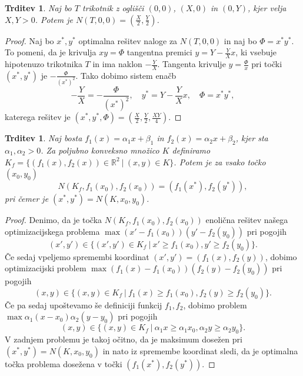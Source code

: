 \documentclass[10pt, a4paper]{article}
\newtheorem{trditev}[izr]{Trditev}
\newenvironment{noticeC}{%
  \tcolorbox[%
  notitle,
  empty,
  enhanced,  %
  breakable,
  coltext=black, 
  fontupper=\rmfamily,
  parbox=false,
  noparskip,
  sharp corners,
  boxrule=-1pt,  %
  frame hidden,
  left=7pt,  %
  right=7pt,
  top=5pt,
  bottom=5pt,
  before skip=2.5ex plus 2pt,
  after skip=2.5ex plus 2pt,
  overlay unbroken and last={%
  },
  ]}
{\endtcolorbox}
\newenvironment{dokaz}%
  {\begin{noticeC}\begin{proof}}%
  {\end{proof}\end{noticeC}}
\newcommand{\R}{\mathbb {R}}
\begin{document}
\begin{trditev}\label{trd:1}
  Naj bo $T$ trikotnik z oglišči $(0, 0)$, $(X, 0)$ in $(0, Y)$,
  kjer velja $X, Y > 0$. Potem je $N(T, 0, 0) = \left(\frac{X}{2}, \frac{Y}{2}\right)$.
\end{trditev}

\begin{dokaz}
  Naj bo $x^*, y^*$ optimalna rešitev naloge za $N(T, 0, 0)$
  in naj bo $\Phi = x^* y^*$. To pomeni, da je krivulja $xy = \Phi$ tangentna premici 
  $y = Y - \frac{Y}{X}x$, ki vsebuje hipotenuzo trikotnika $T$ in 
  ima naklon $-\frac{Y}{X}$. Tangenta krivulje $y = \frac{\Phi}{x}$
  pri točki $(x^*, y^*)$ je $-\frac{\Phi}{(x^*)^2}$.
  Tako dobimo sistem enačb 
  $$-\frac{Y}{X} = - \frac{\Phi}{(x^*)^2},\quad y^* = Y - \frac{Y}{X} x,\quad \Phi = x^* y^*,$$
  katerega rešitev je $(x^*, y^*, \Phi) = \left(\frac{X}{2}, \frac{Y}{2}, \frac{XY}{4}\right)$.
\end{dokaz}

\begin{trditev}\label{trd:2}
  Naj bosta $f_1 (x) = \alpha_1 x + \beta_1$ in $f_2 (x) = \alpha_2 x + \beta_2$,
  kjer sta $\alpha_1, \alpha_2 > 0$.
  Za poljubno konveksno množico $K$
  definiramo $K_f = \{(f_1 (x), f_2 (x))\in \R^2\ |\ (x, y) \in K\}$.
  Potem je za vsako točko $(x_0, y_0)$
  $$N(K_f, f_1(x_0), f_2 (x_0)) = (f_1 (x^*), f_2 (y^*)),$$
  pri čemer je $(x^*, y^*) = N(K, x_0, y_0)$.
\end{trditev}

\begin{dokaz}
  Denimo, da je točka $N (K_f, f_1(x_0), f_2 (x_0))$ enolična rešitev našega optimizacijskega problema 
  $\max (x' - f_1 (x_0)) (y' - f_2(y_0))$ pri pogojih 
  $$(x', y') \in \{(x', y') \in K_f\ |\ x' \geq f_1 (x_0), y' \geq f_2 (y_0)\}.$$
  Če sedaj vpeljemo spremembi koordinat $(x', y') = (f_1 (x), f_2 (y))$, dobimo optimizacijski problem
  $\max (f_1(x) - f_1 (x_0)) (f_2(y) - f_2(y_0))$ pri pogojih 
  $$(x, y) \in \{(x, y) \in K_f\ |\ f_1(x) \geq f_1 (x_0), f_2(y) \geq f_2 (y_0)\}.$$
  Če pa sedaj upoštevamo še definiciji funkcij $f_1, f_2$, dobimo problem 
  $\max \alpha_1 (x -x_0) \alpha_2(y - y_0)$ pri pogojih 
  $$(x, y) \in \{(x, y) \in K_f\ |\ \alpha_1 x \geq \alpha_1 x_0, \alpha_2 y \geq \alpha_2 y_0\}.$$
  V zadnjem problemu je takoj očitno, da je maksimum dosežen pri $(x^*, y^*) = N(K, x_0, y_0)$
  in nato iz spremembe koordinat sledi, da je optimalna točka problema dosežena v točki 
  $(f_1(x^*), f_2(y^*))$.
\end{dokaz}
\end{document}
